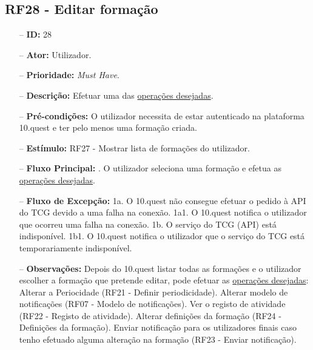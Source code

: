 \subsection{RF28 - Editar formação}
\begin{itemize}
	\item[--] \textbf{ID:} 28
	\item[--]  \textbf{Ator:} Utilizador.
	\item[--]  \textbf{Prioridade:} \textit{Must Have}.
	\item[--]  \textbf{Descrição:} Efetuar uma das \underline{operações desejadas}.
	\item[--]  \textbf{Pré-condições:} O utilizador necessita de estar autenticado na plataforma 10.quest e ter pelo menos uma formação criada.
	\item[--]  \textbf{Estímulo:} RF27 - Mostrar lista de formações do utilizador.
	\item[--]  \textbf{Fluxo Principal:} 
		. O utilizador seleciona uma formação e efetua as \underline{operações desejadas}.
	\item[--]  \textbf{Fluxo de Excepção:} 
		\subitem 1a. O 10.quest não consegue efetuar o pedido à API do TCG devido a uma falha na conexão.
		\subitem 1a1. O 10.quest notifica o utilizador que ocorreu uma falha na conexão.
		\subitem 1b. O serviço do TCG (API) está indisponível.
		\subitem 1b1. O 10.quest notifica o utilizador que o serviço do TCG está temporariamente indisponível. 
	\item[--]  \textbf{Observações:} Depois do 10.quest listar todas as formações e o utilizador escolher a formação que pretende editar, pode efetuar as \underline{operações desejadas}:
		\subitem Alterar a Periocidade (RF21 - Definir periodicidade).
		\subitem Alterar modelo de notificações (RF07 - Modelo de notificações).
		\subitem Ver o registo de atividade (RF22 - Registo de atividade).
		\subitem Alterar definições da formação (RF24 - Definições da formação).
		\subitem Enviar notificação para os utilizadores finais caso tenho efetuado alguma alteração na formação (RF23 - Enviar notificação).
\end{itemize}
\newpage

